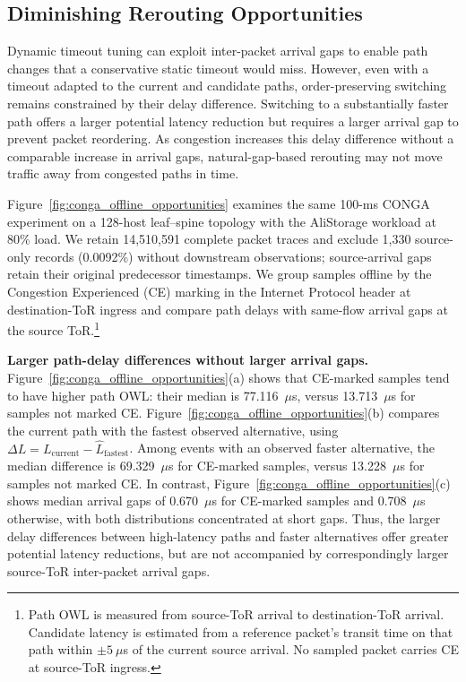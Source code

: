 \documentclass[10pt,journal,compsoc]{IEEEtran}
\begin{document}
\subsection{Diminishing Rerouting Opportunities}
\label{sec:conga_offline_gaps}

Dynamic timeout tuning can exploit inter-packet arrival gaps to enable path changes that a conservative static timeout would miss. However, even with a timeout adapted to the current and candidate paths, order-preserving switching remains constrained by their delay difference. Switching to a substantially faster path offers a larger potential latency reduction but requires a larger arrival gap to prevent packet reordering. As congestion increases this delay difference without a comparable increase in arrival gaps, natural-gap-based rerouting may not move traffic away from congested paths in time.

Figure~\ref{fig:conga_offline_opportunities} examines the same 100-ms CONGA experiment on a 128-host leaf--spine topology with the AliStorage workload at 80\% load. We retain 14,510,591 complete packet traces and exclude 1,330 source-only records (0.0092\%) without downstream observations; source-arrival gaps retain their original predecessor timestamps. We group samples offline by the Congestion Experienced (CE) marking in the Internet Protocol header at destination-ToR ingress and compare path delays with same-flow arrival gaps at the source ToR.\footnote{Path OWL is measured from source-ToR arrival to destination-ToR arrival. Candidate latency is estimated from a reference packet's transit time on that path within $\pm5~\mu$s of the current source arrival. No sampled packet carries CE at source-ToR ingress.}

\noindent
\textbf{Larger path-delay differences without larger arrival gaps.}
Figure~\ref{fig:conga_offline_opportunities}(a) shows that CE-marked samples tend to have higher path OWL: their median is 77.116~$\mu$s, versus 13.713~$\mu$s for samples not marked CE. Figure~\ref{fig:conga_offline_opportunities}(b) compares the current path with the fastest observed alternative, using $\Delta L=L_{\mathrm{current}}-\widehat{L}_{\mathrm{fastest}}$. Among events with an observed faster alternative, the median difference is 69.329~$\mu$s for CE-marked samples, versus 13.228~$\mu$s for samples not marked CE. In contrast, Figure~\ref{fig:conga_offline_opportunities}(c) shows median arrival gaps of 0.670~$\mu$s for CE-marked samples and 0.708~$\mu$s otherwise, with both distributions concentrated at short gaps. Thus, the larger delay differences between high-latency paths and faster alternatives offer greater potential latency reductions, but are not accompanied by correspondingly larger source-ToR inter-packet arrival gaps.
\end{document}
